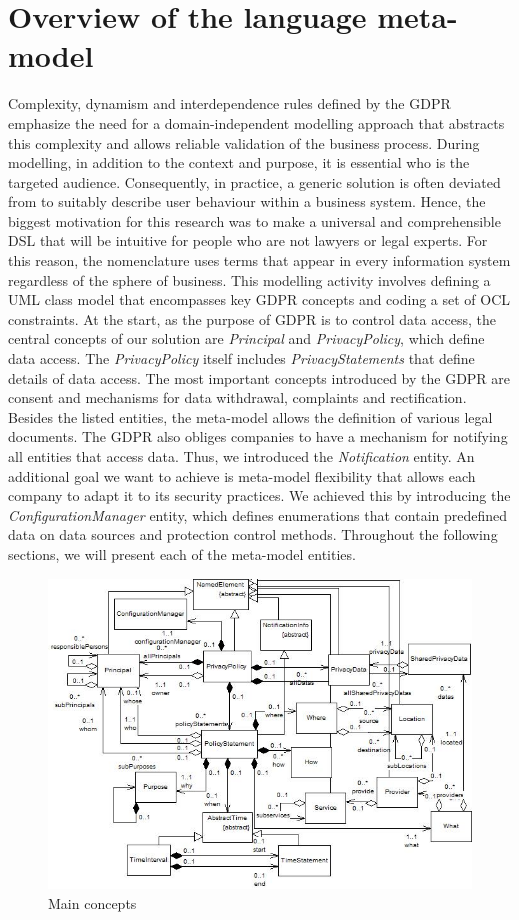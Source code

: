 \documentclass[11pt,english]{article}
\begin{document}
\section{Overview of the language meta-model}
Complexity, dynamism and interdependence rules defined by the GDPR emphasize the need for a domain-independent modelling approach that abstracts this complexity and allows reliable validation of the business process. During modelling, in addition to the context and purpose, it is essential who is the targeted audience. Consequently, in practice, a generic solution is often deviated from to suitably describe user behaviour within a business system. Hence, the biggest motivation for this research was to make a universal and comprehensible DSL that will be intuitive for people who are not lawyers or legal experts. For this reason, the nomenclature uses terms that appear in every information system regardless of the sphere of business. This modelling activity involves defining a UML class model that encompasses key GDPR concepts and coding a set of OCL constraints. At the start, as the purpose of GDPR is to control data access, the central concepts of our solution are \emph{Principal} and \emph{PrivacyPolicy}, which define data access. The \emph{PrivacyPolicy} itself includes \emph{PrivacyStatements} that define details of data access. The most important concepts introduced by the GDPR are consent and mechanisms for data withdrawal, complaints and rectification. Besides the listed entities, the meta-model allows the definition of various legal documents. The GDPR also obliges companies to have a mechanism for notifying all entities that access data. Thus, we introduced the \emph{Notification} entity. An additional goal we want to achieve is meta-model flexibility that allows each company to adapt it to its security practices. We achieved this by introducing the \emph{ConfigurationManager} entity, which defines enumerations that contain predefined data on data sources and protection control methods. Throughout the following sections, we will present each of the meta-model entities.
\begin{figure}[H]
    \centering
    \includegraphics[width=12.5cm]{images/mainconcepts.jpg}
    \caption{Main concepts}
    \label{fig:mainconcepts}
\end{figure}
\end{document}
